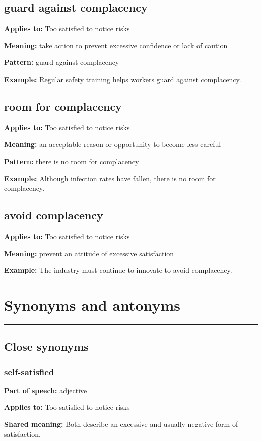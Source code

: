 \documentclass[11pt]{article}
\newcommand{\sectionrule}{\par\vspace{-0.5em}\noindent\textcolor{Accent}{\rule{\linewidth}{0.6pt}}\par}
\begin{document}
\subsection{guard against complacency}
\textbf{Applies to:} Too satisfied to notice risks

\textbf{Meaning:} take action to prevent excessive confidence or lack of caution

\textbf{Pattern:} guard against complacency

\textbf{Example:} Regular safety training helps workers guard against complacency.

\subsection{room for complacency}
\textbf{Applies to:} Too satisfied to notice risks

\textbf{Meaning:} an acceptable reason or opportunity to become less careful

\textbf{Pattern:} there is no room for complacency

\textbf{Example:} Although infection rates have fallen, there is no room for complacency.

\subsection{avoid complacency}
\textbf{Applies to:} Too satisfied to notice risks

\textbf{Meaning:} prevent an attitude of excessive satisfaction

\textbf{Example:} The industry must continue to innovate to avoid complacency.

\section{Synonyms and antonyms}
\sectionrule
\subsection{Close synonyms}
\subsubsection{self-satisfied}
\textbf{Part of speech:} adjective

\textbf{Applies to:} Too satisfied to notice risks

\textbf{Shared meaning:} Both describe an excessive and usually negative form of satisfaction.
\end{document}
